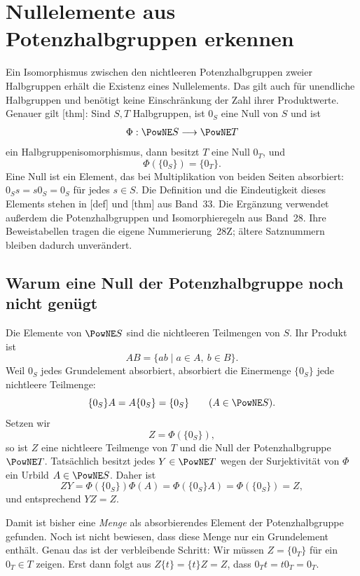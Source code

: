 \chapter{Nullelemente aus Potenzhalbgruppen erkennen}
\hypertarget{zero-transport.reading}{}

Ein Isomorphismus zwischen den nichtleeren Potenzhalbgruppen zweier
Halbgruppen erhält die Existenz eines Nullelements. Das gilt auch für
unendliche Halbgruppen und benötigt keine Einschränkung der Zahl ihrer
Produktwerte. Genauer gilt
[thm]:
Sind \(S,T\) Halbgruppen, ist \(0_S\) eine Null von \(S\) und ist
\[
 \Phi:\PowNE S\longrightarrow\PowNE T
\]
ein Halbgruppenisomorphismus, dann besitzt \(T\) eine Null \(0_T\), und
\[
 \Phi(\{0_S\})=\{0_T\}.
\]
Eine Null ist ein Element, das bei Multiplikation von beiden Seiten
absorbiert: \(0_Ss=s0_S=0_S\) für jedes \(s\in S\).
Die Definition und die Eindeutigkeit dieses Elements stehen in
[def] und
[thm] aus Band~33.
Die Ergänzung verwendet außerdem die Potenzhalbgruppen und
Isomorphieregeln aus Band~28. Ihre Beweistabellen tragen die eigene
Nummerierung~28Z; ältere Satznummern bleiben dadurch unverändert.

\section{Warum eine Null der Potenzhalbgruppe noch nicht genügt}

Die Elemente von \(\PowNE S\) sind die nichtleeren Teilmengen von \(S\).
Ihr Produkt ist
\[
 AB=\{ab\mid a\in A,\ b\in B\}.
\]
Weil \(0_S\) jedes Grundelement absorbiert, absorbiert die Einermenge
\(\{0_S\}\) jede nichtleere Teilmenge:
\[
 \{0_S\}A=A\{0_S\}=\{0_S\}\qquad(A\in\PowNE S).
\]
Setzen wir
\[
 Z=\Phi(\{0_S\}),
\]
so ist \(Z\) eine nichtleere Teilmenge von \(T\) und die Null
der Potenzhalbgruppe \(\PowNE T\). Tatsächlich besitzt jedes
\(Y\in\PowNE T\) wegen der Surjektivität von \(\Phi\) ein Urbild
\(A\in\PowNE S\). Daher ist
\[
 ZY=\Phi(\{0_S\})\Phi(A)
    =\Phi(\{0_S\}A)=\Phi(\{0_S\})=Z,
\]
und entsprechend \(YZ=Z\).

Damit ist bisher eine \emph{Menge} als absorbierendes Element der
Potenzhalbgruppe gefunden. Noch ist nicht bewiesen, dass diese Menge
nur ein Grundelement enthält. Genau das ist der verbleibende Schritt:
Wir müssen \(Z=\{0_T\}\) für ein \(0_T\in T\) zeigen. Erst dann
folgt aus \(Z\{t\}=\{t\}Z=Z\), dass
\(0_Tt=t0_T=0_T\).

